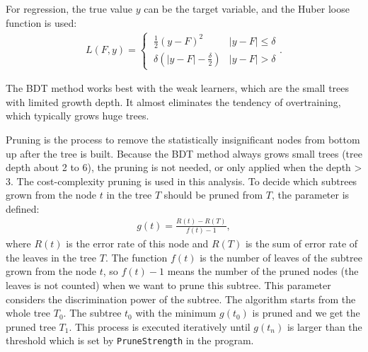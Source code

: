 For regression, the true value $y$ can be the target variable, and the Huber loose function is used:
\begin{equation} \label{eq:HuberLF}
  \begin{aligned}
	L(F,y) = \begin{cases}
		\ \frac{1}{2}(y-F)^{2} & |y-F|\leq\delta \\
		\ \delta (|y-F|-\frac{\delta}{2}) & |y-F|>\delta
	\end{cases}.
  \end{aligned}
\end{equation}

The BDT method works best with the weak learners, which are the small trees with limited growth depth.
It almost eliminates the tendency of overtraining, which typically grows huge trees.

Pruning is the process to remove the statistically insignificant nodes from bottom up after the tree is built.
Because the BDT method always grows small trees (tree depth about 2 to 6), the pruning is not needed, or only applied when the depth > 3.
The cost-complexity pruning is used in this analysis.
To decide which subtrees grown from the node $t$ in the tree $T$ should be pruned from $T$, the parameter is defined:
\begin{equation} \label{eq:CostCplxGt}
  \begin{aligned}
	g(t) = \frac{R(t)-R(T)}{f(t)-1},
  \end{aligned}
\end{equation}
where $R(t)$ is the error rate of this node and $R(T)$ is the sum of error rate of the leaves in the tree $T$.
The function $f(t)$ is the number of leaves of the subtree grown from the node $t$, so $f(t)-1$ means the number of the pruned nodes (the leaves is not counted) when we want to prune this subtree.
This parameter considers the discrimination power of the subtree.
The algorithm starts from the whole tree $T_{0}$.
The subtree $t_{0}$ with the minimum $g(t_{0})$ is pruned and we get the pruned tree $T_{1}$.
This process is executed iteratively until $g(t_{n})$ is larger than the threshold which is set by \verb|PruneStrength| in the program.


%

